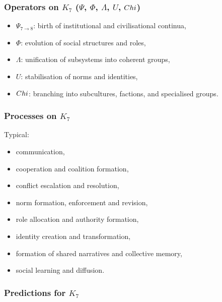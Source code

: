 \subsubsection{Operators on \texorpdfstring{$K_7$}{K_7} (\texorpdfstring{$\Psi$}{\Psi}, \texorpdfstring{$\Phi$}{\Phi}, \texorpdfstring{$\Lambda$}{\Lambda}, \texorpdfstring{$U$}{U}, \texorpdfstring{$Chi$}{\Chi})}

\begin{itemize}
    \item $\Psi_{7\to8}$: birth of institutional and civilisational continua,
    \item $\Phi$: evolution of social structures and roles,
    \item $\Lambda$: unification of subsystems into coherent groups,
    \item $U$: stabilisation of norms and identities,
    \item $Chi$: branching into subcultures, factions, and specialised groups.
\end{itemize}

\subsubsection{Processes on \texorpdfstring{$K_7$}{K_7}}

Typical:
\begin{itemize}
    \item communication,
    \item cooperation and coalition formation,
    \item conflict escalation and resolution,
    \item norm formation, enforcement and revision,
    \item role allocation and authority formation,
    \item identity creation and transformation,
    \item formation of shared narratives and collective memory,
    \item social learning and diffusion.
\end{itemize}

\subsubsection{Predictions for \texorpdfstring{$K_7$}{K_7}}

